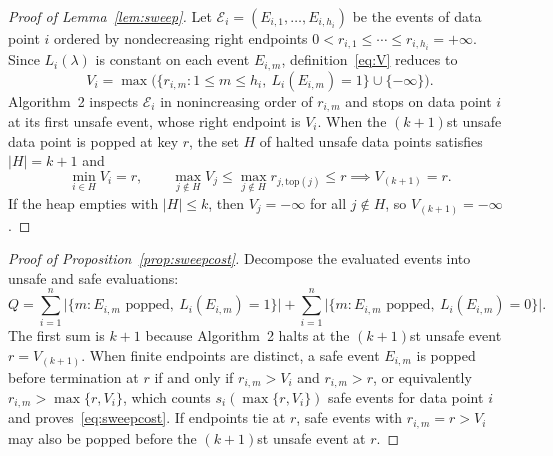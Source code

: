 \documentclass[a4paper,10pt]{article}
\theoremstyle{plain}
\theoremstyle{remark}
\begin{document}
\begin{proof}[Proof of Lemma~\ref{lem:sweep}]
Let $\mathcal E_i=(E_{i,1},\ldots,E_{i,h_i})$ be the events of data point $i$ ordered by nondecreasing right endpoints $0<r_{i,1}\le\cdots\le r_{i,h_i}=+\infty$. Since $L_i(\lambda)$ is constant on each event $E_{i,m}$, definition~\eqref{eq:V} reduces to
\begin{equation}\label{eq:proof-lem42-vi}
 V_i=\max\bigl(\{r_{i,m}:1\le m\le h_i,\ L_i(E_{i,m})=1\}\cup\{-\infty\}\bigr).
\end{equation}
Algorithm~2 inspects $\mathcal E_i$ in nonincreasing order of $r_{i,m}$ and stops on data point $i$ at its first unsafe event, whose right endpoint is $V_i$. When the $(k+1)$st unsafe data point is popped at key $r$, the set $H$ of halted unsafe data points satisfies $|H|=k+1$ and
\begin{equation}\label{eq:proof-lem42-order}
 \min_{i\in H}V_i = r,\qquad
 \max_{j\notin H}V_j \le \max_{j\notin H} r_{j,\mathrm{top}(j)} \le r
 \implies V_{(k+1)}=r.
\end{equation}
If the heap empties with $|H|\le k$, then $V_j=-\infty$ for all $j\notin H$, so $V_{(k+1)}=-\infty$.
\end{proof}

\begin{proof}[Proof of Proposition~\ref{prop:sweepcost}]
Decompose the evaluated events into unsafe and safe evaluations:
\begin{equation}\label{eq:proof-prop43-part}
 Q=\sum_{i=1}^n \bigl|\{m:E_{i,m}\text{ popped},\ L_i(E_{i,m})=1\}\bigr|
 +\sum_{i=1}^n \bigl|\{m:E_{i,m}\text{ popped},\ L_i(E_{i,m})=0\}\bigr|.
\end{equation}
The first sum is $k+1$ because Algorithm~2 halts at the $(k+1)$st unsafe event $r=V_{(k+1)}$. When finite endpoints are distinct, a safe event $E_{i,m}$ is popped before termination at $r$ if and only if $r_{i,m}>V_i$ and $r_{i,m}>r$, or equivalently $r_{i,m}>\max\{r,V_i\}$, which counts $s_i(\max\{r,V_i\})$ safe events for data point $i$ and proves~\eqref{eq:sweepcost}. If endpoints tie at $r$, safe events with $r_{i,m}=r>V_i$ may also be popped before the $(k+1)$st unsafe event at $r$.
\end{proof}
\end{document}
